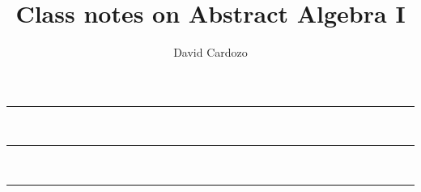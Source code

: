 \documentclass[notitlepage]{article}
\author{David Cardozo}
\title{Class notes on Abstract Algebra I}
\begin{document}



\noindent\rule{\textwidth}{1pt}\\[-0.1cm]


\noindent\rule{\textwidth}{1pt}\\[-0.1cm]
	

\noindent\rule{\textwidth}{1pt}\\[-0.1cm]


	
\end{document}

